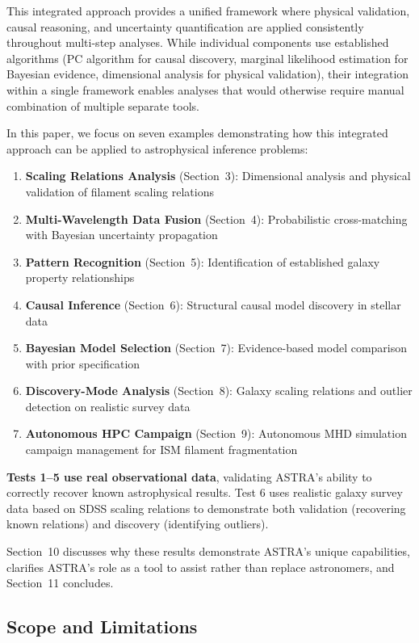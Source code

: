 \documentclass[usenatbib]{rasti}
\begin{document}
This integrated approach provides a unified framework where physical validation, causal reasoning, and uncertainty quantification are applied consistently throughout multi-step analyses. While individual components use established algorithms (PC algorithm for causal discovery, marginal likelihood estimation for Bayesian evidence, dimensional analysis for physical validation), their integration within a single framework enables analyses that would otherwise require manual combination of multiple separate tools.

In this paper, we focus on seven examples demonstrating how this integrated approach can be applied to astrophysical inference problems:
\begin{enumerate}
\item \textbf{Scaling Relations Analysis} (Section~3): Dimensional analysis and physical validation of filament scaling relations
\item \textbf{Multi-Wavelength Data Fusion} (Section~4): Probabilistic cross-matching with Bayesian uncertainty propagation
\item \textbf{Pattern Recognition} (Section~5): Identification of established galaxy property relationships
\item \textbf{Causal Inference} (Section~6): Structural causal model discovery in stellar data
\item \textbf{Bayesian Model Selection} (Section~7): Evidence-based model comparison with prior specification
\item \textbf{Discovery-Mode Analysis} (Section~8): Galaxy scaling relations and outlier detection on realistic survey data
\item \textbf{Autonomous HPC Campaign} (Section~9): Autonomous MHD simulation campaign management for ISM filament fragmentation
\end{enumerate}

\textbf{Tests 1--5 use real observational data}, validating ASTRA's ability to correctly recover known astrophysical results. Test 6 uses realistic galaxy survey data based on SDSS scaling relations to demonstrate both validation (recovering known relations) and discovery (identifying outliers).

Section~10 discusses why these results demonstrate ASTRA's unique capabilities, clarifies ASTRA's role as a tool to assist rather than replace astronomers, and Section~11 concludes.

\subsection{Scope and Limitations}
\end{document}
